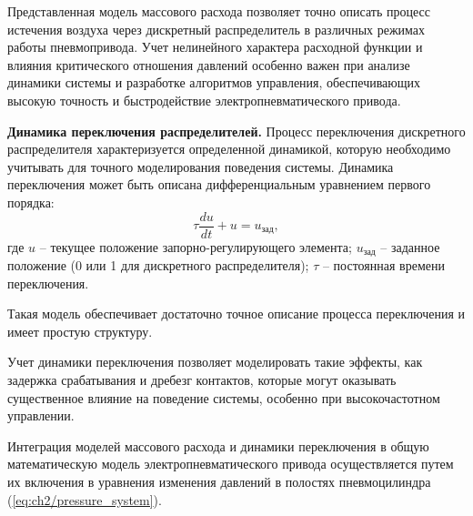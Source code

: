 Представленная модель массового расхода позволяет точно описать процесс истечения
воздуха через дискретный распределитель в различных режимах работы
пневмопривода. Учет нелинейного характера расходной функции и
влияния критического отношения давлений особенно важен при анализе динамики
системы и разработке алгоритмов управления, обеспечивающих высокую точность
и быстродействие электропневматического привода.

\textbf{Динамика переключения распределителей.}
Процесс переключения дискретного распределителя характеризуется
определенной динамикой, которую необходимо учитывать для точного моделирования поведения
системы. Динамика переключения может быть описана дифференциальным уравнением первого порядка:
\begin{equation}
	\label{eq:ch2/switching_dynamics}
	\tau \frac{du}{dt} + u = u_{\text{зад}},
\end{equation}
где
$u$ -- текущее положение запорно-регулирующего элемента;
$u_{\text{зад}}$ -- заданное положение (0 или 1 для дискретного распределителя);
$\tau$ -- постоянная времени переключения.

Такая модель обеспечивает достаточно точное описание процесса переключения
и имеет простую структуру.

Учет динамики переключения позволяет моделировать такие эффекты, как задержка
срабатывания и дребезг контактов, которые могут оказывать
существенное влияние на поведение системы,
особенно при высокочастотном управлении.

Интеграция моделей массового расхода и динамики переключения
в общую математическую модель электропневматического привода
осуществляется путем их включения в уравнения
изменения давлений в полостях пневмоцилиндра (\ref{eq:ch2/pressure_system}).
